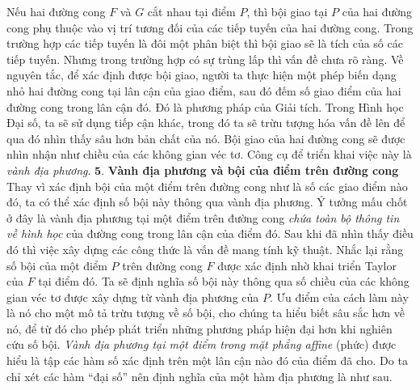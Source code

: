 \begin{multicols}{2}
	\vspace*{-10pt}
	\vskip 0.2cm
	Nếu hai đường cong $F$  và $G$  cắt nhau tại điểm $P$, thì bội giao tại $P$ của hai đường cong phụ thuộc vào vị trí tương đối của các tiếp tuyến của hai đường cong. Trong trường hợp các tiếp tuyến là đôi một phân biệt thì bội giao sẽ là tích của số các tiếp tuyến. Nhưng trong trường hợp có sự trùng lấp thì vấn đề chưa rõ ràng. 
	\vskip 0.1cm
	Về nguyên tắc, để xác định được bội giao, người ta thực hiện một phép biến dạng nhỏ hai đường cong tại lân cận của giao điểm, sau đó đếm số giao điểm của hai đường cong trong lân cận đó. Đó là phương pháp của Giải tích. Trong Hình học Đại số, ta sẽ sử dụng tiếp cận khác, trong đó ta sẽ trừu tượng hóa vấn đề lên để qua đó nhìn thấy sâu hơn bản chất của nó. Bội giao của hai đường cong sẽ được nhìn nhận như chiều của các không gian véc tơ. Công cụ để triển khai việc này là {\em vành địa phương}. 
	\vskip 0.1cm
	$\pmb{5.}$ \textbf{\color{duongvaotoanhoc}Vành địa phương và bội của điểm trên đường cong} 
	\vskip 0.1cm 
	Thay vì xác định bội của một điểm trên đường cong như là số các giao điểm nào đó, ta có thể xác định số bội này thông qua vành địa phương. Ý tưởng mấu chốt ở đây là vành địa phương tại một điểm trên đường cong {\em chứa toàn bộ thông tin về hình học} của đường cong trong lân cận của điểm đó. Sau khi đã nhìn thấy điều đó thì việc xây dựng các công thức là vấn đề mang tính kỹ thuật. 
	\vskip 0.1cm
	Nhắc lại rằng số bội của một điểm $P$ trên đường cong $F$ được xác định nhờ khai triển Taylor của $F$ tại điểm đó. Ta sẽ định nghĩa số bội này thông qua số chiều của các không gian véc tơ được xây dựng từ vành địa phương của $P$.  Ưu điểm của cách làm này là nó cho một mô tả trừu tượng về số bội, cho chúng ta hiểu biết sâu sắc hơn về nó, để từ đó cho phép phát triển những phương pháp hiện đại hơn khi nghiên cứu số bội. 
	\vskip 0.1cm
	{\em Vành địa phương tại một điểm trong mặt phẳng affine} (phức) được hiểu là tập các hàm số xác định trên một lân cận nào đó của điểm đã cho. Do ta chỉ xét các hàm ``đại số'' nên định nghĩa của một hàm địa phương là như sau.

\end{multicols}
